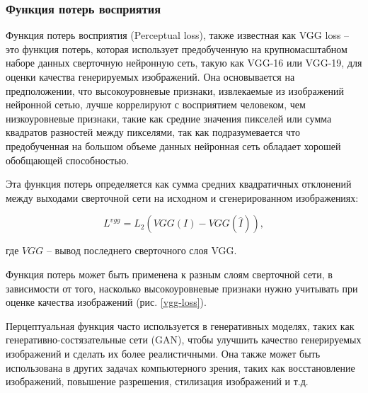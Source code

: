 \subsubsection{Функция потерь восприятия}

Функция потерь восприятия (Perceptual loss), также известная как VGG loss -- это функция потерь, которая использует предобученную на крупномасштабном наборе данных сверточную нейронную сеть, такую как VGG-16 или VGG-19, для оценки качества генерируемых изображений. Она основывается на предположении, что высокоуровневые признаки, извлекаемые из изображений нейронной сетью, лучше коррелируют с восприятием человеком, чем низкоуровневые признаки, такие как средние значения пикселей или сумма квадратов разностей между пикселями, так как подразумевается что предобученная на большом объеме данных нейронная сеть обладает хорошей обобщающей способностью.

Эта функция потерь определяется как сумма средних квадратичных отклонений между выходами сверточной сети на исходном и сгенерированном изображениях:

\begin{equation}
    \label{eq:2-1-3-1}
    L^{vgg} = L_{2}(VGG(I)-VGG(\hat{I})),
\end{equation}

где $VGG$ -- вывод последнего сверточного слоя VGG.

Функция потерь может быть применена к разным слоям сверточной сети, в зависимости от того, насколько высокоуровневые признаки нужно учитывать при оценке качества изображений (рис. \ref{vgg-loss}). 


Перцептуальная функция часто используется в генеративных моделях, таких как генеративно-состязательные сети (GAN), чтобы улучшить качество генерируемых изображений и сделать их более реалистичными. Она также может быть использована в других задачах компьютерного зрения, таких как восстановление изображений, повышение разрешения, стилизация изображений и т.д.